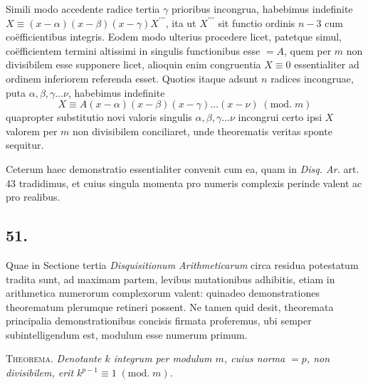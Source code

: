 \documentclass[twoside,12pt]{memoir}
\renewcommand{\pmod}[1]{\;(\textrm{mod.}\;#1)}
\begin{document}
Simili modo accedente radice tertia \(\gamma\) prioribus incongrua, habebimus indefinite \(X \equiv(x-\alpha)(x-\beta)(x-\gamma) X^{\prime \prime \prime}\), ita ut \(X^{\prime \prime \prime}\) sit functio ordinis \(n-3\) cum coëfficientibus integris. Eodem modo ulterius procedere licet, patetque simul, coëfficientem termini altissimi in singulis functionibus esse \(=A\), quem per \(m\) non divisibilem esse supponere licet, alioquin enim congruentia \(X \equiv 0\) essentialiter ad ordinem inferiorem referenda esset. Quoties itaque adsunt \(n\) radices incongruae, puta \(\alpha, \beta, \gamma \ldots \nu\), habebimus indefinite
\[X \equiv A(x-\alpha)(x-\beta)(x-\gamma) \ldots(x-\nu)\pmod{m}\]
quapropter substitutio novi valoris singulis \(\alpha, \beta, \gamma \ldots \nu\) incongrui certo ipsi \(X\) valorem per \(m\) non divisibilem conciliaret, unde theorematis veritas sponte sequitur.
 
Ceterum haec demonstratio essentialiter convenit cum ea, quam in \textit{Disq. Ar.} art. 43 tradidimus, et cuius singula momenta pro numeris complexis perinde valent ac pro realibus.\pagebreak%

\subsection*{51.}
 
Quae in Sectione tertia \textit{Disquisitionum Arithmeticarum} circa residua potestatum tradita sunt, ad maximam partem, levibus mutationibus adhibitis, etiam in arithmetica numerorum complexorum valent: quinadeo demonstrationes theorematum plerumque retineri possent. Ne tamen quid desit, theoremata principalia demonstrationibus concisis firmata proferemus, ubi semper subintelligendum est, modulum esse numerum primum.

\textsc{Theorema.} \textit{Denotante \(k\) integrum per modulum \(m\), cuius norma \(=p\), non divisibilem, erit \(k^{p-1} \equiv 1 \pmod{m}\).}
 
\end{document}
